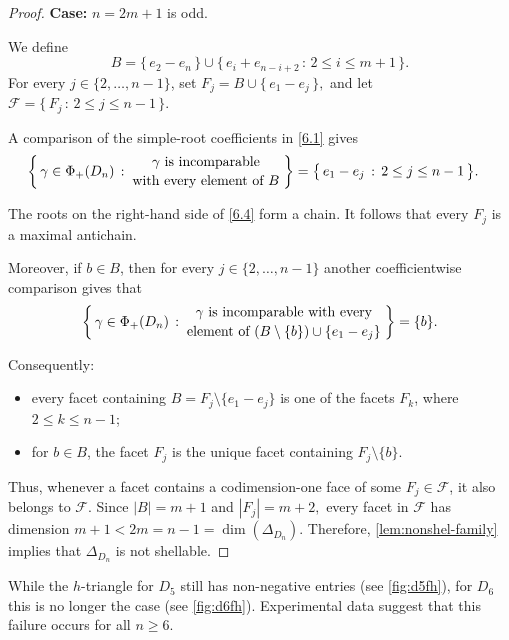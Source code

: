 \documentclass[11pt]{amsart}
\def\cF{\mathcal{F}}
\theoremstyle{plain}
\numberwithin{lemma}{\DefaultNumberTheoremWithin}
\numberwithin{theorem}{\DefaultNumberTheoremWithin}
\numberwithin{corollary}{\DefaultNumberTheoremWithin}
\numberwithin{proposition}{\DefaultNumberTheoremWithin}
\numberwithin{conjecture}{\DefaultNumberTheoremWithin}
\theoremstyle{definition}
\numberwithin{definition}{\DefaultNumberTheoremWithin}
\numberwithin{question}{\DefaultNumberTheoremWithin}
\numberwithin{problem}{\DefaultNumberTheoremWithin}
\theoremstyle{remark}
\numberwithin{remark}{\DefaultNumberTheoremWithin}
\numberwithin{example}{\DefaultNumberTheoremWithin}
\numberwithin{claim}{\DefaultNumberTheoremWithin}
\begin{document}
\begin{proof}
\medskip

\noindent\textbf{Case:} $n=2m+1$ is odd.

We define
\[
B=
\big\{\,e_2-e_n\,\big\}
\cup
\big\{\,e_i+e_{n-i+2}\,:\,2\leq i\leq m+1\,\big\}.
\]
For every $j\in\{2,\ldots,n-1\}$, set
$
F_j=B\cup \big\{\,e_1-e_j\,\big\},
$
and let
$
\cF= \big\{\,F_j\,:\,2\leq j\leq n-1\,\big\}.
$

A comparison of the simple-root coefficients in \eqref{6.1} 
gives
\begin{align} \label{6.4}
\left\{
\,\gamma\in\Phi_+(D_n)\,:\,
\genfrac{}{}{0pt}{}{\gamma \text{ is incomparable}}{\text{with every element of } B}\,
\right\}
& =
\big\{\,e_1-e_j\,:\,2\leq j\leq n-1\,\big\}.
\end{align}

The roots on the right-hand side of \eqref{6.4} form a chain. It
follows that every $F_j$ is a maximal antichain.

Moreover, if $b\in B$, then for every $j \in \{2,\ldots, n-1\}$
another coefficientwise comparison
gives  that
\begin{align} \label{6.5}
\left\{
\,\gamma\in\Phi_+(D_n)\,:\,
\genfrac{}{}{0pt}{}{\gamma\text{ is incomparable with every}}{\text{element of }
(B\setminus\{b\})\cup\{e_1-e_j\}}
\,\right\}
=
\{b\}.
\end{align}

Consequently:

\begin{itemize}
\item every facet containing $B=F_j\setminus\{e_1-e_j\}$ is one
      of the facets $F_k$, where $2\leq k\leq n-1$;
\item for $b\in B$, the facet $F_j$ is the unique facet
      containing $F_j\setminus\{b\}$.
\end{itemize}

Thus, whenever a facet contains a codimension-one face of some
$F_j\in\cF$, it also belongs to $\cF$.
Since
$
|B|=m+1
$
and
$
|F_j|=m+2,
$
every facet in $\cF$ has dimension $m+1<2m=n-1 = \dim(\Delta_{D_n})$.
Therefore, \ref{lem:nonshel-family} implies that
$\Delta_{D_n}$ is not shellable.
\end{proof}

While the $h$-triangle for $D_5$ still has non-negative entries
(see \ref{fig:d5fh}), for $D_6$
this is no longer the case (see \ref{fig:d6fh}). Experimental data suggest that this failure occurs for all $n \geq 6$.
\end{document}
